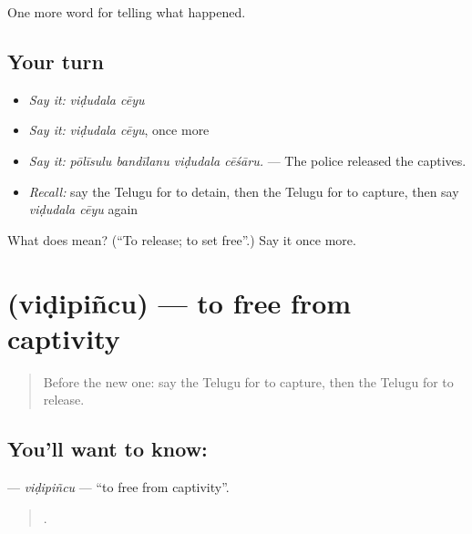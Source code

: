 \begin{grammarlens}[title={What you've built}]
One more word for telling what happened.
\end{grammarlens}

\subsection*{Your turn}
\begin{itemize}
\raggedright
  \item \emph{Say it:} \emph{viḍudala cēyu}
  \item \emph{Say it:} \emph{viḍudala cēyu}, once more
  \item \emph{Say it:} \emph{pōlīsulu bandīlanu viḍudala cēśāru.} — The police released the captives.
  \item \emph{Recall:} say the Telugu for to detain, then the Telugu for to capture, then say \emph{viḍudala cēyu} again
\end{itemize}

\begin{tcolorbox}[breakable,colback=teal!4,colframe=teal!35!black,title={Before you move on}]
What does   mean? (\textquotedblleft{}To release; to set free\textquotedblright{}.) Say it once more.
\end{tcolorbox}
\section[\texorpdfstring{\te{విడిపించు} (viḍipiñcu)}{విడిపించు (viḍipiñcu)}]{ (viḍipiñcu) — to free from captivity}

\label{lesson:TE-C351-vidipincu}



\begin{quote}
Before the new one: say the Telugu for to capture, then the Telugu for to release.
\end{quote}

\subsection*{You'll want to know: }
\textbf{} — \emph{viḍipiñcu} — \textquotedblleft{}to free from captivity\textquotedblright{}.

\begin{quote}
   .
\end{quote}

